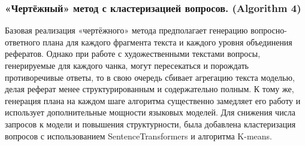 \documentclass{superfri}
\begin{document}
\subsubsection{«Чертёжный» метод с кластеризацией вопросов. (Algorithm 4)}
Базовая реализация «чертёжного» метода предполагает генерацию вопросно-ответного
плана для каждого фрагмента текста и каждого уровня объединения рефератов. Однако при работе с художественными текстами вопросы, генерируемые для каждого чанка,
могут пересекаться и порождать противоречивые ответы,  то в свою очередь сбивает агрегацию текста моделью, делая реферат менее структурированным
и содержательно полным. К тому же, генерация плана на каждом шаге алгоритма существенно замедляет его работу и использует дополнительные мощности языковых моделей.
Для снижения числа запросов к модели и повышения структурности, была добавлена кластеризация вопросов с использованием SentenceTransformers и алгоритма K-means.
\end{document}
